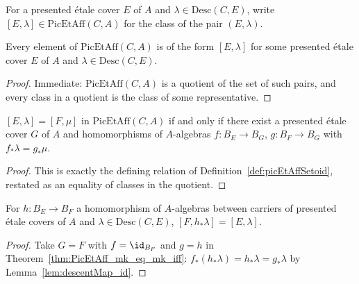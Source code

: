\begin{definition}
  \label{def:PicEtAff_mk}
  \leanok
  For a presented \'etale cover \(E\) of \(A\) and \(\lambda \in \mathrm{Desc}(C,E)\), write
  \([E,\lambda] \in \mathrm{PicEtAff}(C,A)\) for the class of the pair \((E,\lambda)\).
\end{definition}

\begin{lemma}
  \label{lem:PicEtAff_ind}
  \leanok
  Every element of \(\mathrm{PicEtAff}(C,A)\) is of the form \([E,\lambda]\) for some presented
  \'etale cover \(E\) of \(A\) and \(\lambda \in \mathrm{Desc}(C,E)\).
\end{lemma}
\begin{proof}
  \leanok
  Immediate: \(\mathrm{PicEtAff}(C,A)\) is a quotient of the set of such pairs, and every class
  in a quotient is the class of some representative.
\end{proof}

\begin{theorem}
  \label{thm:PicEtAff_mk_eq_mk_iff}
  \leanok
  \([E,\lambda] = [F,\mu]\) in \(\mathrm{PicEtAff}(C,A)\) if and only if there exist a presented
  \'etale cover \(G\) of \(A\) and homomorphisms of \(A\)-algebras \(f \colon B_E \to B_G\),
  \(g \colon B_F \to B_G\) with \(f_{*}\lambda = g_{*}\mu\).
\end{theorem}
\begin{proof}
  \leanok
  This is exactly the defining relation of Definition~\ref{def:picEtAffSetoid}, restated as an
  equality of classes in the quotient.
\end{proof}

\begin{lemma}
  \label{lem:PicEtAff_mk_descentMap}
  \leanok
  For \(h \colon B_E \to B_F\) a homomorphism of \(A\)-algebras between carriers of presented
  \'etale covers of \(A\) and \(\lambda \in \mathrm{Desc}(C,E)\), \([F, h_{*}\lambda] =
  [E,\lambda]\).
\end{lemma}
\begin{proof}
  \leanok
  Take \(G = F\) with \(f = \id_{B_F}\) and \(g = h\) in Theorem~\ref{thm:PicEtAff_mk_eq_mk_iff}:
  \(f_{*}(h_{*}\lambda) = h_{*}\lambda = g_{*}\lambda\) by Lemma~\ref{lem:descentMap_id}.
\end{proof}

